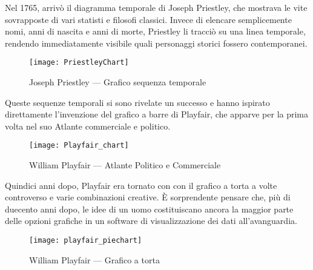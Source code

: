 
Nel 1765, arrivò il diagramma temporale di Joseph Priestley, che mostrava le vite sovrapposte di vari statisti e filosofi classici. 
Invece di elencare semplicemente nomi, anni di nascita e anni di morte, Priestley li tracciò su una linea temporale, rendendo immediatamente visibile quali personaggi storici fossero contemporanei.

\begin{figure}[htp]
    \centering
    \texttt{[image: PriestleyChart]}
    \caption{Joseph Priestley — Grafico sequenza temporale}
    \label{fig:PriestleyChart}
\end{figure}

Queste sequenze temporali si sono rivelate un successo e hanno ispirato direttamente l'invenzione del grafico a barre di Playfair, che apparve per la prima volta nel suo Atlante commerciale e politico.

\begin{figure}[htp]
    \centering
    \texttt{[image: Playfair\_chart]}
    \caption{William Playfair — Atlante Politico e Commerciale}
    \label{fig:playfair_chart}
\end{figure}

Quindici anni dopo, Playfair era tornato con con il grafico a torta a volte controverso e varie combinazioni creative. È sorprendente pensare che, più di duecento anni dopo, le idee di un uomo costituiscano ancora la maggior parte delle opzioni grafiche in un software di visualizzazione dei dati all'avanguardia.

\begin{figure}[htp]
    \centering
    \texttt{[image: playfair\_piechart]}
    \caption{William Playfair — Grafico a torta}
    \label{fig:playfair_piechart}
\end{figure}




